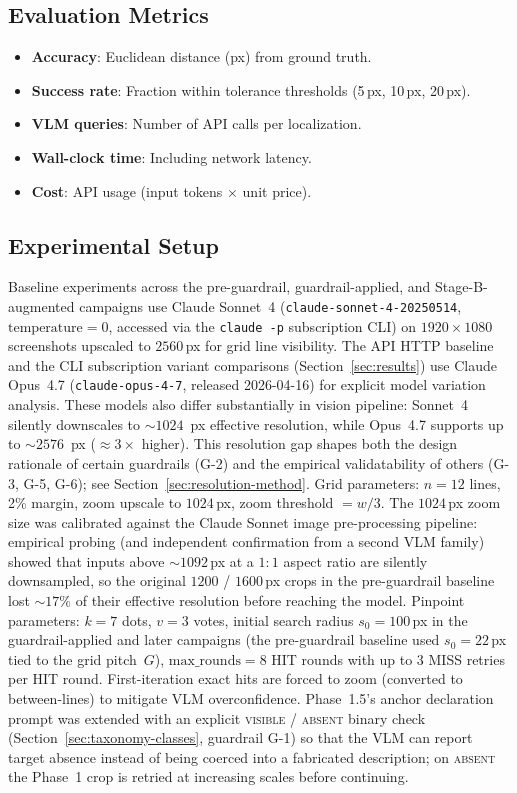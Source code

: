 \documentclass[sigconf,nonacm]{acmart}
\begin{document}
\subsection{Evaluation Metrics}

\begin{itemize}
  \item \textbf{Accuracy}: Euclidean distance (px) from ground truth.
  \item \textbf{Success rate}: Fraction within tolerance thresholds
    (5\,px, 10\,px, 20\,px).
  \item \textbf{VLM queries}: Number of API calls per localization.
  \item \textbf{Wall-clock time}: Including network latency.
  \item \textbf{Cost}: API usage (input tokens $\times$ unit price).
\end{itemize}


\subsection{Experimental Setup}

Baseline experiments across the pre-guardrail, guardrail-applied,
and Stage-B-augmented campaigns use Claude Sonnet~4
(\texttt{claude-sonnet-4-20250514}, $\mathrm{temperature}=0$,
accessed via the \texttt{claude -p} subscription CLI) on
$1920 \times 1080$ screenshots upscaled to $2560$\,px for grid
line visibility.  The API HTTP baseline and the CLI subscription
variant comparisons (Section~\ref{sec:results}) use Claude
Opus~4.7 (\texttt{claude-opus-4-7}, released 2026-04-16) for
explicit model variation analysis.
These models also differ substantially in vision pipeline:
Sonnet~4 silently downscales to $\sim\!1024$~px effective
resolution, while Opus~4.7 supports up to $\sim\!2576$~px
($\approx\!3\times$ higher).  This resolution gap shapes both
the design rationale of certain guardrails (G-2) and the
empirical validatability of others (G-3, G-5, G-6); see
Section~\ref{sec:resolution-method}.  Grid
parameters: $n=12$ lines, 2\% margin, zoom upscale to $1024$\,px, zoom
threshold $= w/3$.  The $1024$\,px zoom size was calibrated against the
Claude Sonnet image pre-processing pipeline: empirical probing (and
independent confirmation from a second VLM family) showed that inputs
above $\sim$$1092$\,px at a $1{:}1$ aspect ratio are silently
downsampled, so the original $1200$ / $1600$\,px crops in the
pre-guardrail baseline lost $\sim$$17\%$ of their effective
resolution before reaching the model.  Pinpoint parameters:
$k=7$ dots, $v=3$ votes, initial search radius $s_0 = 100$\,px
in the guardrail-applied and later campaigns (the pre-guardrail
baseline used $s_0 = 22$\,px tied to the grid pitch~$G$),
$\mathrm{max\_rounds}=8$ HIT rounds with up to $3$ MISS retries
per HIT round.  First-iteration exact hits are
forced to zoom (converted to between-lines) to mitigate VLM
overconfidence.  Phase~1.5's anchor declaration prompt was extended
with an explicit \textsc{visible} / \textsc{absent} binary check
(Section~\ref{sec:taxonomy-classes}, guardrail G-1) so that the VLM
can report target absence instead of being coerced into a fabricated
description; on \textsc{absent} the Phase~1 crop is retried at
increasing scales before continuing.
\end{document}
